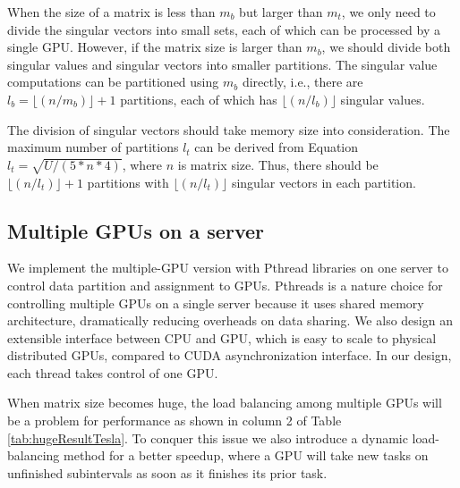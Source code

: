 When the size of a matrix is less than $m_b$ but larger than $m_t$,
we only need to divide the singular vectors into small sets, each of which can be processed by a single GPU.
However, if the matrix size is larger than $m_b$, we should divide both singular values and singular vectors into smaller partitions.
The singular value computations can be partitioned using $m_b$ directly, i.e., there are $l_b = \lfloor(n/m_b)\rfloor + 1$ partitions, each of which has $\lfloor(n/l_b)\rfloor$ singular values.

The division of singular vectors should take memory size into consideration.
The maximum number of partitions $l_t$ can be derived from Equation $l_t = \sqrt{U/(5 * n * 4)}$, 
where $n$ is matrix size.
Thus, there should be $\lfloor(n/l_t)\rfloor+1$ partitions with
$\lfloor(n/l_t)\rfloor$ singular vectors in each partition.

\vspace{-0.1in}
\subsection{Multiple GPUs on a server}\label{sec_mgpu}
\vspace{-0.1in}
We implement the multiple-GPU version with Pthread libraries on one server
to control data partition and assignment to GPUs.
Pthreads is a nature choice for controlling multiple GPUs on a single server
because it uses shared memory architecture, dramatically reducing overheads
on data sharing. We also design an extensible interface between CPU and GPU,
 which is easy to scale to physical distributed GPUs, compared to CUDA asynchronization interface. In our design, each thread takes control of one GPU.

When matrix size becomes huge, the load balancing among multiple GPUs will be a problem for performance as shown in column 2 of Table \ref{tab:hugeResultTesla}.
To conquer this issue we also introduce a dynamic load-balancing method for a better speedup, where a GPU will take new tasks on unfinished subintervals as soon as it finishes its prior task.

